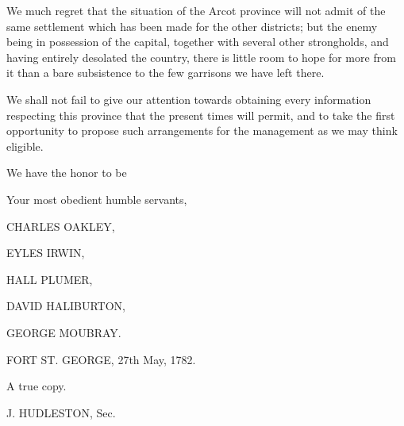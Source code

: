 We much regret that the situation of the Arcot province will not admit of the same settlement which has been made for the other districts; but the enemy being in possession of the capital, together with several other strongholds, and having entirely desolated the country, there is little room to hope for more from it than a bare subsistence to the few garrisons we have left there.

We shall not fail to give our attention towards obtaining every information respecting this province that the present times will permit, and to take the first opportunity to propose such arrangements for the management as we may think eligible.

We have the honor to be

\hspace{1in} Your most obedient humble servants,

\hspace{3in} CHARLES OAKLEY,

\hspace{3in} EYLES IRWIN,

\hspace{3in} HALL PLUMER,

\hspace{3in} DAVID HALIBURTON,

\hspace{3in} GEORGE MOUBRAY.

FORT ST. GEORGE, 27th May, 1782.

\hspace{2.5in} A true copy.

\hspace{3in} J. HUDLESTON, Sec.


